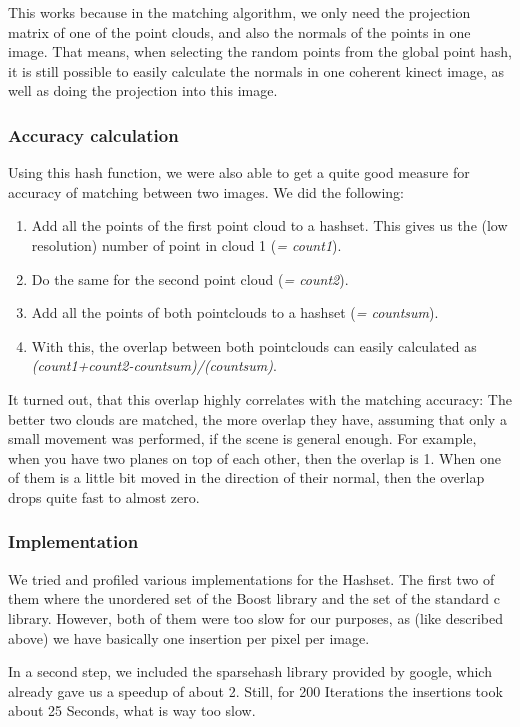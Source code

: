 \documentclass[10pt,twocolumn,letterpaper]{article}
\begin{document}
This works because in the matching algorithm, we only need the projection matrix of
one of the point clouds, and also the normals of the points in one image. That means, when selecting the random points from the global point hash, it is
still possible to easily calculate the normals in one coherent kinect image, as well as doing the projection into this image.


\subsubsection{Accuracy calculation}
Using this hash function, we were also able to get a quite good measure for accuracy of matching between two images. We did the following:
\begin{enumerate}
\item Add all the points of the first point cloud to a hashset. This gives us the (low resolution) number of point in cloud 1 (\textit{= count1}).
\item Do the same for the second point cloud (\textit{= count2}).
\item Add all the points of both pointclouds to a hashset (\textit{= countsum}).
\item With this, the overlap between both pointclouds can easily calculated as \textit{(count1+count2-countsum)/(countsum)}.
\end{enumerate}
It turned out, that this overlap highly correlates with the matching accuracy: The better two clouds are matched, the more overlap they have, assuming
that only a small movement was performed, if the scene is general enough. For example, when you have two planes on top of each other, then the overlap
is 1. When one of them is a little bit moved in the direction of their normal, then the overlap drops quite fast to almost zero.

\subsubsection{Implementation}
We tried and profiled various implementations for the Hashset. The first two of them where the unordered set of the Boost library and the set of the
standard c library. However, both of them were too slow for our purposes, as (like described above) we have basically one insertion per pixel per image.

In a second step, we included the sparsehash library provided by google, which already gave us a speedup of about 2. Still, for 200 Iterations the
insertions took about 25 Seconds, what is way too slow.
\end{document}
